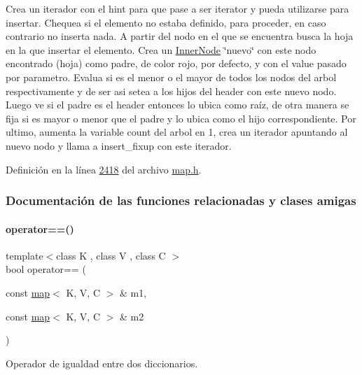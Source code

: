 Crea un iterador con el hint para que pase a ser iterator y pueda utilizarse para insertar. Chequea si el elemento no estaba definido, para proceder, en caso contrario no inserta nada. A partir del nodo en el que se encuentra busca la hoja en la que insertar el elemento. Crea un \hyperlink{structaed2_1_1map_1_1InnerNode}{Inner\+Node} \char`\"{}nuevo\char`\"{} con este nodo encontrado (hoja) como padre, de color rojo, por defecto, y con el value pasado por parametro. Evalua si es el menor o el mayor de todos los nodos del arbol respectivamente y de ser asi setea a los hijos del header con este nuevo nodo. Luego ve si el padre es el header entonces lo ubica como raíz, de otra manera se fija si es mayor o menor que el padre y lo ubica como el hijo correspondiente. Por ultimo, aumenta la variable count del arbol en 1, crea un iterador apuntando al nuevo nodo y llama a insert\+\_\+fixup con este iterador. 

Definición en la línea \hyperlink{map_8h_source_l02418}{2418} del archivo \hyperlink{map_8h_source}{map.\+h}.



\subsubsection{Documentación de las funciones relacionadas y clases amigas}
\mbox{\label{classaed2_1_1map_abfc51b39670220e79037ac067006e933_abfc51b39670220e79037ac067006e933}} 
\paragraph{\texorpdfstring{operator==()}{operator==()}}
{\footnotesize\ttfamily template$<$class K , class V , class C $>$ \\
bool operator== (\begin{DoxyParamCaption}\item[{const \hyperlink{classaed2_1_1map}{map}$<$ K, V, C $>$ \&}]{m1,  }\item[{const \hyperlink{classaed2_1_1map}{map}$<$ K, V, C $>$ \&}]{m2 }\end{DoxyParamCaption})\hspace{0.3cm}{\ttfamily [related]}}



Operador de igualdad entre dos diccionarios. 


